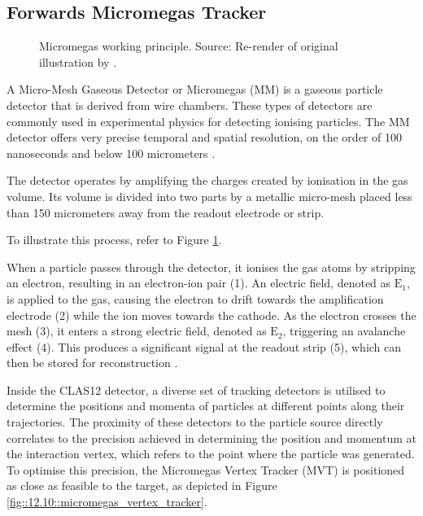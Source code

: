 \subsection{Forwards Micromegas Tracker}
\label{12.10::forwards_micromegas_tracker}
    \begin{figure}[b!]
        \centering{}
        \caption[MM working principle.]{Micromegas working principle.
        Source: Re-render of original illustration by \cite{giomataris1996}.}
        \label{fig::12.10::micromegas_principle}
    \end{figure}

    A Micro-Mesh Gaseous Detector or Micromegas (MM) is a gaseous particle detector that is derived from wire chambers.
    These types of detectors are commonly used in experimental physics for detecting ionising particles.
    The MM detector offers very precise temporal and spatial resolution, on the order of 100 nanoseconds and below 100 micrometers \cite{giomataris1996}.

    The detector operates by amplifying the charges created by ionisation in the gas volume.
    Its volume is divided into two parts by a metallic micro-mesh placed less than 150 micrometers away from the readout electrode or strip.

    To illustrate this process, refer to Figure \ref{fig::12.10::micromegas_principle}.

    When a particle passes through the detector, it ionises the gas atoms by stripping an electron, resulting in an electron-ion pair (1).
    An electric field, denoted as $\text{E}_1$, is applied to the gas, causing the electron to drift towards the amplification electrode (2) while the ion moves towards the cathode.
    As the electron crosses the mesh (3), it enters a strong electric field, denoted as $\text{E}_2$, triggering an avalanche effect (4).
    This produces a significant signal at the readout strip (5), which can then be stored for reconstruction \cite{giomataris1996}.

    Inside the CLAS12 detector, a diverse set of tracking detectors is utilised to determine the positions and momenta of particles at different points along their trajectories.
    The proximity of these detectors to the particle source directly correlates to the precision achieved in determining the position and momentum at the interaction vertex, which refers to the point where the particle was generated.
    To optimise this precision, the Micromegas Vertex Tracker (MVT) is positioned as close as feasible to the target, as depicted in Figure \ref{fig::12.10::micromegas_vertex_tracker}.

